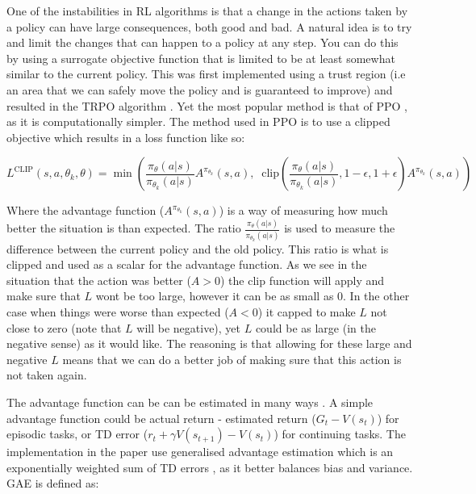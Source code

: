 One of the instabilities in RL algorithms is that a change in the actions taken by a policy can have large consequences, both good and bad. A natural idea is to try and limit the changes that can happen to a policy at any step. You can do this by using a surrogate objective function that is limited to be at least somewhat similar to the current policy. This was first implemented using a trust region (i.e an area that we can safely move the policy and is guaranteed to improve) and resulted in the TRPO algorithm \cite{schulmanTrustRegionPolicy2017}. Yet the most popular method is that of PPO \cite{schulmanProximalPolicyOptimization2017}, as it is computationally simpler. The method used in PPO is to use a clipped objective which results in a loss function like so:

\begin{equation}
L^{\text{CLIP}}(s,a,\theta_k,\theta) = \min\left(
\frac{\pi_{\theta}(a|s)}{\pi_{\theta_k}(a|s)}  A^{\pi_{\theta_k}}(s,a), \;\;
\text{clip}\left(\frac{\pi_{\theta}(a|s)}{\pi_{\theta_k}(a|s)}, 1 - \epsilon, 1+\epsilon \right) A^{\pi_{\theta_k}}(s,a)
\right)
\end{equation}

Where the advantage function ($A^{\pi_{\theta_{k}}}(s,a)$) is a way of measuring how much better the situation is than expected. The ratio $\frac{\pi_{\theta}(a|s)}{\pi_{\theta_{k}}(a|s)}$ is used to measure the difference between the current policy and the old policy. This ratio is what is clipped and used as a scalar for the advantage function. As we see in the situation that the action was better ($A>0$) the clip function will apply and make sure that $L$ wont be too large, however it can be as small as 0. In the other case when things were worse than expected ($A < 0$) it capped to make $L$ not close to zero (note that $L$ will be negative), yet $L$ could be as large (in the negative sense) as it would like. The reasoning is that allowing for these large and negative $L$ means that we can do a better job of making sure that this action is not taken again.

The advantage function can be can be estimated in many ways . A simple advantage function could be actual return - estimated return ($G_{t} - V(s_{t})$) for episodic tasks, or TD error ($r_{t}+\gamma V(s_{t+1})-V(s_{t})$) for continuing tasks. The implementation in the paper use generalised advantage estimation which is an exponentially weighted sum of TD errors \cite{schulmanHighDimensionalContinuousControl2015}, as it better balances bias and variance. GAE is defined as:

